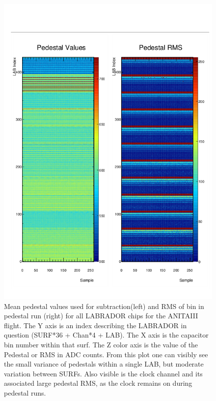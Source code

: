 \begin{figure}
	\centering
	\includegraphics[height=0.8\textheight]{figures/Pedestals_big2}
	\caption{Mean pedestal values used for subtraction(left) and RMS of bin in pedestal run (right) for all LABRADOR chips for the ANITAIII flight.  The Y axis is an index describing the LABRADOR in question (SURF*36 + Chan*4 + LAB).  The X axis is the capacitor bin number within that surf.  The Z color axis is the value of the Pedestal or RMS in ADC counts.  From this plot one can visibly see the small variance of pedestals within a single LAB, but moderate variation between SURFs.  Also visible is the clock channel and its associated large pedestal RMS, as the clock remains on during pedestal runs.}
	\label{fig:pedestals}
\end{figure}	
				
				
